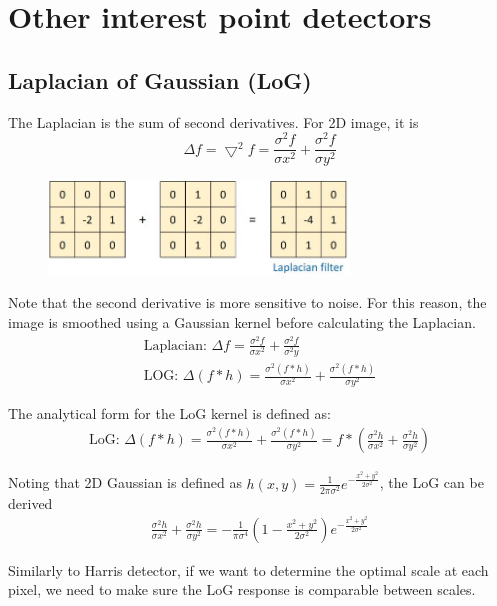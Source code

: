 \documentclass{report}
\begin{document}
\section{Other interest point detectors}

\subsection{Laplacian of Gaussian (LoG)}

The Laplacian is the sum of second derivatives. For 2D image, it is
$$
    \Delta f = \bigtriangledown^2 f = \frac{\sigma^2 f}{\sigma x^2} + \frac{\sigma^2 f}{\sigma y^2}
$$
\begin{figure}[h]
    \centering
    \includegraphics[width=8cm]{Laplacian.JPG}
\end{figure}

Note that the second derivative is more sensitive to noise. For this reason, the
image is smoothed using a Gaussian kernel before calculating the Laplacian. 
\begin{gather*}
    \text{Laplacian: } \Delta f = \frac{\sigma^2 f}{\sigma x^2} + \frac{\sigma^2 f}{\sigma ^2y} \\
    \text{LOG: } \Delta(f*h) = \frac{\sigma^2(f*h)}{\sigma x^2} + \frac{\sigma^2 (f*h)}{\sigma y^2}
\end{gather*}

The analytical form for the LoG kernel is defined as:
\begin{gather*}
    \text{LoG: } \Delta(f*h) = \frac{\sigma^2(f*h)}{\sigma x^2} + \frac{\sigma^2(f*h)}{\sigma y^2} = f*\left(\frac{\sigma^2 h}{\sigma x^2} + \frac{\sigma^2 h}{\sigma y^2}\right)
\end{gather*}

Noting that 2D Gaussian is defined as $h(x,y) = \frac{1}{2\pi \sigma^2}
e^{-\frac{x^2 + y^2}{2\sigma^2}}$, the LoG can be derived 
\begin{gather*}
    \frac{\sigma^2 h}{\sigma x^2} + \frac{\sigma^2 h}{\sigma y^2} = -
    \frac{1}{\pi \sigma^4} \left(1 - \frac{x^2 + y^2}{2\sigma^2}\right) e^{-\frac{x^2 + y^2}{2\sigma^2}}
\end{gather*}

Similarly to Harris detector, if we want to determine the optimal scale at
each pixel, we need to make sure the LoG response is comparable between
scales. 
\end{document}
